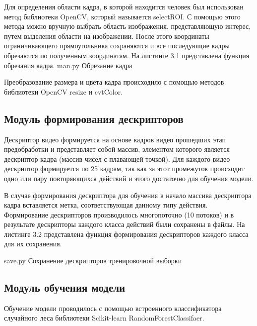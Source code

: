 Для определения области кадра, в которой находится человек был использован метод библиотеки OpenCV, который называется selectROI. С помощью этого метода можно вручную выбрать область изображения, представляющую интерес, путем выделения области на изображении. После этого координаты ограничивающего прямоугольника сохраняются и все последующие кадры обрезаются по полученным координатам. На листинге 3.1 представлена функция обрезания кадра.
{man.py} %
{Обрезание кадра} %

Преобразование размера и цвета кадра происходило с помощью методов библиотеки OpenCV resize и cvtColor.



\subsection{Модуль формирования дескрипторов}
Дескриптор видео формируется на основе кадров видео прошедших этап предобработки и представляет собой массив, элементом которого является дескриптор кадра (массив чисел с плавающей точкой). Для каждого видео дескриптор формируется по 25 кадрам, так как за этот промежуток происходит одно или пару повторяющихся действий и этого достаточно для обучения модели.

В случае формирования дескриптора для обучения в начало массива дескриптора кадра вставляется метка, соответствующая данному типу действия. Формирование дескрипторов производилось многопоточно (10 потоков) и в результате дескрипторы каждого класса действий были сохранены в файлы.
На листинге 3.2 представлена функция формирования дескрипторов каждого класса для их сохранения.

{save.py} %
{Сохранение дескрипторов тренировочной выборки} %
\subsection{Модуль обучения модели}

Обучение модели проводилось с помощью встроенного классификатора случайного леса библиотеки Scikit-learn RandomForestClassifaer. 
\clearpage



